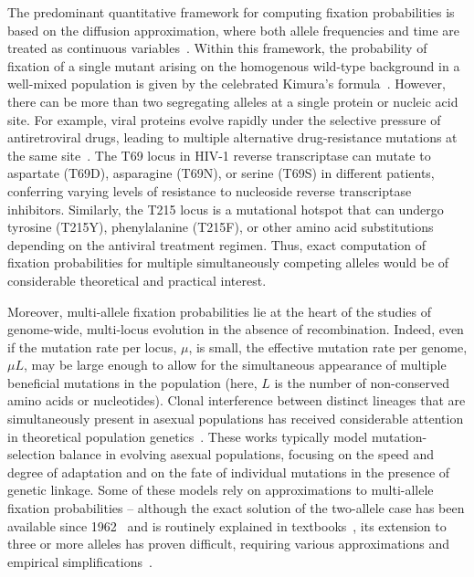 \documentclass[9pt,twocolumn,twoside]{gsajnl}
\begin{document}
The predominant quantitative framework for computing fixation probabilities is based on the diffusion approximation, where both allele frequencies and time are treated as continuous variables~\citep{Kimura1964,Kimura1983,Ewens2004}. Within this framework, the probability of fixation of a single mutant arising on the homogenous wild-type background in a well-mixed
population is given by the celebrated Kimura's formula~\citep{Kimura1962}. However, there can be more than two segregating alleles at a single protein or nucleic acid site.
For example, viral proteins evolve rapidly under the selective pressure of antiretroviral drugs, leading to multiple alternative drug-resistance mutations at the same site~\citep{Rhee2007}.
The T69 locus in HIV-1 reverse transcriptase can mutate to aspartate (T69D), asparagine (T69N), or serine (T69S) in different patients, conferring varying levels of resistance to nucleoside reverse transcriptase inhibitors.
Similarly, the T215 locus is a mutational hotspot that can undergo tyrosine (T215Y), phenylalanine (T215F), or other amino acid substitutions depending on the antiviral treatment regimen.
Thus, exact computation of fixation probabilities for multiple simultaneously competing alleles would be of considerable theoretical and practical interest. 

Moreover, multi-allele fixation probabilities lie at the heart of the studies of genome-wide, multi-locus evolution in the absence of recombination.
Indeed, even if the mutation rate per locus, $\mu$, is small, the effective mutation rate per genome,
$\mu L$, may be large enough to allow for the simultaneous appearance of multiple beneficial mutations in the population (here, $L$ is the number of non-conserved amino acids or nucleotides).
Clonal interference between distinct lineages that are simultaneously present in asexual populations %
has received considerable attention in theoretical population genetics~\citep{Tsimring1996,Gerrish1998,Rouzine2003,Wilke2004,Park2007,Desai2007a,Desai2007b,Fogle2008,Park2010,Schiffels2011,Hallatschek2011,Good2012}.
These works typically model mutation-selection balance in evolving asexual populations,
focusing on the speed and degree of adaptation and on the fate of individual mutations in the presence of genetic linkage. Some of these models rely on approximations to multi-allele fixation probabilities -- although the exact
solution of the two-allele case has been available since 1962~\citep{Kimura1962} and is routinely explained in textbooks~\citep{Kimura1983,Gillespie2004,Crow2009}, its extension to three or more alleles has proven difficult,
requiring various approximations and empirical simplifications~\citep{Lessard2009,Overall2024,Braga2026}.
\end{document}
